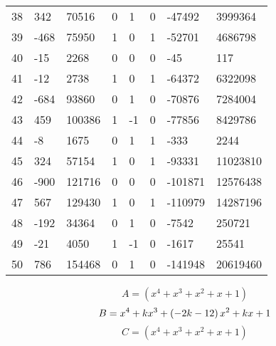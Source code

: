 \documentclass{amsart}
\begin{document}
\begin{longtable}{|l|l|l|lllll|}
38&342&70516&0&1&0&-47492&3999364\\
39&-468&75950&1&0&1&-52701&4686798\\
40&-15&2268&0&0&0&-45&117\\
41&-12&2738&1&0&1&-64372&6322098\\
42&-684&93860&0&1&0&-70876&7284004\\
43&459&100386&1&-1&0&-77856&8429786\\
44&-8&1675&0&1&1&-333&2244\\
45&324&57154&1&0&1&-93331&11023810\\
46&-900&121716&0&0&0&-101871&12576438\\
47&567&129430&1&0&1&-110979&14287196\\
48&-192&34364&0&1&0&-7542&250721\\
49&-21&4050&1&-1&0&-1617&25541\\
50&786&154468&0&1&0&-141948&20619460\\
\hline
\end{longtable}
$$A=(x^4
 + x^3
 + x^2
 + x
 + 1)$$
$$B=x^4
 + k\*x^3
 + \left(-2\*k
 - 12\right) \*x^2
 + k\*x
 + 1$$
$$C=(x^4
 + x^3
 + x^2
 + x
 + 1)$$
\end{document}
